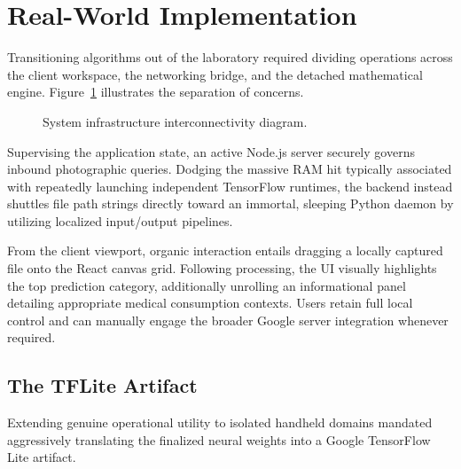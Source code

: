 \documentclass[conference]{IEEEtran}
\begin{document}
\section{Real-World Implementation}

Transitioning algorithms out of the laboratory required dividing operations across the client workspace, the networking bridge, and the detached mathematical engine. Figure~\ref{fig:sysarch} illustrates the separation of concerns.

\begin{figure}[htbp]
\centering
{}
\caption{System infrastructure interconnectivity diagram.}
\label{fig:sysarch}
\end{figure}

Supervising the application state, an active Node.js server securely governs inbound photographic queries. Dodging the massive RAM hit typically associated with repeatedly launching independent TensorFlow runtimes, the backend instead shuttles file path strings directly toward an immortal, sleeping Python daemon by utilizing localized input/output pipelines.

From the client viewport, organic interaction entails dragging a locally captured file onto the React canvas grid. Following processing, the UI visually highlights the top prediction category, additionally unrolling an informational panel detailing appropriate medical consumption contexts. Users retain full local control and can manually engage the broader Google server integration whenever required.

\subsection{The TFLite Artifact}
Extending genuine operational utility to isolated handheld domains mandated aggressively translating the finalized neural weights into a Google TensorFlow Lite artifact. 
\end{document}
